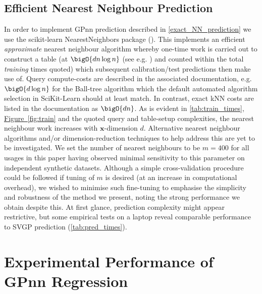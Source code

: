 \subsection{Efficient Nearest Neighbour Prediction}
\label{efficient_nn_prediction}
In order to implement GPnn prediction described in \ref{exact_NN_prediction} we use the scikit-learn NearestNeighbors package (\cite{scikit-learn}). This implements an efficient {\it approximate} nearest neighbour algorithm whereby one-time work is carried out to construct a table (at \(\bigO{dn\log n}\) (see e.g. \cite{Friedman1977, Omohundro1989}) and counted within the total {\it training} times quoted) which subsequent calibration/test predictions then make use of. Query compute-costs are described in the associated documentation, e.g. \(\bigO{d\log n}\) for the Ball-tree algorithm which the default automated algorithm selection in SciKit-Learn should at least match. In contrast, exact kNN costs are listed in the documentation as \(\bigO{dn}\). As is evident in \autoref{tab:train_times}, \hyperref[{fig:train}]{Figure~\ref*{fig:train}} and the quoted query and table-setup complexities, the nearest neighbour work increases with $\bm{x}$-dimension $d$. Alternative nearest neighbour algorithms and/or dimension-reduction techniques to help address this are yet to be investigated. We set the number of nearest neighbours to be $m = 400$ for all usages in this paper having observed minimal sensitivity to this parameter on independent synthetic datasets. Although a simple cross-validation procedure could be followed if tuning of $m$ is desired (at an increase in computational overhead), we wished to minimise such fine-tuning to emphasise the simplicity and robustness of the method we present, noting the strong performance we obtain despite this. At first glance, prediction complexity might appear restrictive, but some empirical tests on a laptop reveal comparable performance to SVGP prediction (\autoref{tab:pred_times}).

\section{Experimental Performance of GPnn Regression}
\label{performance}


